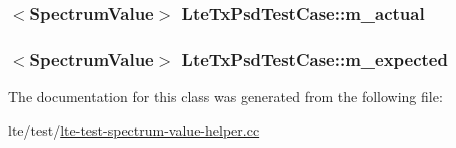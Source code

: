 \subsubsection[{\texorpdfstring{m\+\_\+actual}{m_actual}}]{$<${\bf Spectrum\+Value}$>$ Lte\+Tx\+Psd\+Test\+Case\+::m\+\_\+actual\hspace{0.3cm}{\ttfamily [protected]}}\hypertarget{classLteTxPsdTestCase_a2eb0a26ccc92a084294f720ff26636ca}{}\label{classLteTxPsdTestCase_a2eb0a26ccc92a084294f720ff26636ca}
\subsubsection[{\texorpdfstring{m\+\_\+expected}{m_expected}}]{$<${\bf Spectrum\+Value}$>$ Lte\+Tx\+Psd\+Test\+Case\+::m\+\_\+expected\hspace{0.3cm}{\ttfamily [protected]}}\hypertarget{classLteTxPsdTestCase_a70608bd572943322beb8cf9092da25a8}{}\label{classLteTxPsdTestCase_a70608bd572943322beb8cf9092da25a8}


The documentation for this class was generated from the following file\+:\begin{DoxyCompactItemize}
\item 
lte/test/\hyperlink{lte-test-spectrum-value-helper_8cc}{lte-\/test-\/spectrum-\/value-\/helper.\+cc}\end{DoxyCompactItemize}

